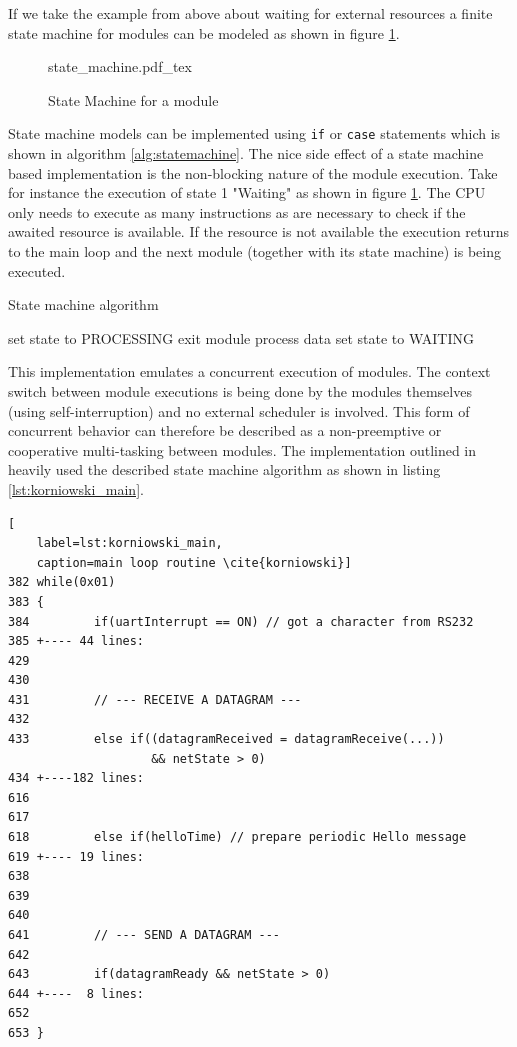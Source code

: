 If we take the example from above about waiting for external resources a finite state machine for modules can be modeled as shown in figure \ref{fig:statemachine}.

\begin{figure}[H]
\centering
{state_machine.pdf_tex}
\caption{State Machine for a module}
\label{fig:statemachine}
\end{figure}

State machine models can be implemented using \texttt{if} or \texttt{case} statements which is shown in algorithm \ref{alg:statemachine}. The nice side effect of a state machine based implementation is the non-blocking nature of the module execution. Take for instance the execution of state 1 "Waiting" as shown in figure \ref{fig:statemachine}. The CPU only needs to execute as many instructions as are necessary to check if the awaited resource is available. If the resource is not available the execution returns to the main loop and the next module (together with its state machine) is being executed.

\begin{algorithm}[H]
\caption{State machine algorithm}
\label{alg:statemachine}
\begin{algorithmic}
        \STATE set state to PROCESSING
    \ELSE
        \STATE exit module
    \ENDIF
{}
    \STATE process data
    \STATE set state to WAITING
\ENDIF
\end{algorithmic}
\end{algorithm}

This implementation emulates a concurrent execution of modules. The context switch between module executions is being done by the modules themselves (using self-interruption) and no external scheduler is involved. This form of concurrent behavior can therefore be described as a non-preemptive or cooperative multi-tasking between modules. The implementation outlined in \cite{korniowski} heavily used the described state machine algorithm as shown in listing \ref{lst:korniowski_main}.

\begin{lstlisting}[
	label=lst:korniowski_main,
	caption=main loop routine \cite{korniowski}]
382 while(0x01)
383 {
384         if(uartInterrupt == ON) // got a character from RS232
385 +---- 44 lines: 
429 
430 
431         // --- RECEIVE A DATAGRAM ---
432 
433         else if((datagramReceived = datagramReceive(...)) 
                    && netState > 0)     
434 +----182 lines: 
616 
617     
618         else if(helloTime) // prepare periodic Hello message
619 +---- 19 lines: 
638 
639 
640     
641         // --- SEND A DATAGRAM ---
642     
643         if(datagramReady && netState > 0)
644 +----  8 lines: 
652 
653 }
\end{lstlisting}

